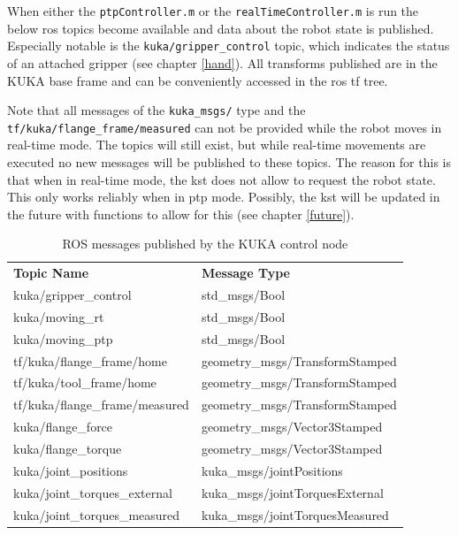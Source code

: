 \documentclass[headsepline,footinclude=false,fontsize=11pt,paper=a4,listof=totoc,bibliography=totoc,BCOR=12mm,DIV=14]{scrbook}
\begin{document}
When either the \texttt{ptpController.m} or the \texttt{realTimeController.m} is run the below \gls{ros} topics become available and data about the robot state is published. Especially notable is the \texttt{kuka/gripper\_control} topic, which indicates the status of an attached gripper (see chapter \ref{hand}). All transforms published are in the KUKA base frame and can be conveniently accessed in the \gls{ros} tf tree. 

Note that all messages of the \texttt{kuka\_msgs/} type and the \texttt{tf/kuka/flange\_frame/measured} can not be provided while the robot moves in real-time mode. The topics will still exist, but while real-time movements are executed no new messages will be published to these topics. The reason for this is that when in real-time mode, the \gls{kst} does not allow to request the robot state. This only works reliably when in \gls{ptp} mode. Possibly, the \gls{kst} will be updated in the future with functions to allow for this (see chapter \ref{future}).

\begin{table}[h]
\centering
\begin{tabular}{ll}
\textbf{Topic Name}            & \textbf{Message Type}           \\
kuka/gripper\_control          & std\_msgs/Bool                  \\
kuka/moving\_rt                & std\_msgs/Bool                  \\
kuka/moving\_ptp               & std\_msgs/Bool                  \\
tf/kuka/flange\_frame/home     & geometry\_msgs/TransformStamped \\
tf/kuka/tool\_frame/home       & geometry\_msgs/TransformStamped \\
tf/kuka/flange\_frame/measured & geometry\_msgs/TransformStamped \\
kuka/flange\_force             & geometry\_msgs/Vector3Stamped   \\
kuka/flange\_torque            & geometry\_msgs/Vector3Stamped   \\
kuka/joint\_positions          & kuka\_msgs/jointPositions       \\
kuka/joint\_torques\_external  & kuka\_msgs/jointTorquesExternal \\
kuka/joint\_torques\_measured  & kuka\_msgs/jointTorquesMeasured
\end{tabular}
\caption{ROS messages published by the KUKA control node}
\label{tab:my-table}
\end{table}
\end{document}
